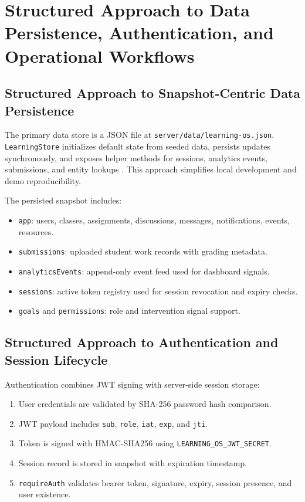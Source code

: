 \section{Structured Approach to Data Persistence, Authentication, and Operational Workflows}

\subsection{Structured Approach to Snapshot-Centric Data Persistence}

The primary data store is a JSON file at \texttt{server/data/learning-os.json}. \texttt{LearningStore} initializes default state from seeded data, persists updates synchronously, and exposes helper methods for sessions, analytics events, submissions, and entity lookups \cite{repo-store}. This approach simplifies local development and demo reproducibility.

The persisted snapshot includes:
\begin{itemize}[leftmargin=1.5em]
  \item \texttt{app}: users, classes, assignments, discussions, messages, notifications, events, resources.
  \item \texttt{submissions}: uploaded student work records with grading metadata.
  \item \texttt{analyticsEvents}: append-only event feed used for dashboard signals.
  \item \texttt{sessions}: active token registry used for session revocation and expiry checks.
  \item \texttt{goals} and \texttt{permissions}: role and intervention signal support.
\end{itemize}

\subsection{Structured Approach to Authentication and Session Lifecycle}

Authentication combines JWT signing with server-side session storage:
\begin{enumerate}[leftmargin=1.5em]
  \item User credentials are validated by SHA-256 password hash comparison.
  \item JWT payload includes \texttt{sub}, \texttt{role}, \texttt{iat}, \texttt{exp}, and \texttt{jti}.
  \item Token is signed with HMAC-SHA256 using \texttt{LEARNING\_OS\_JWT\_SECRET}.
  \item Session record is stored in snapshot with expiration timestamp.
  \item \texttt{requireAuth} validates bearer token, signature, expiry, session presence, and user existence.
\end{enumerate}


